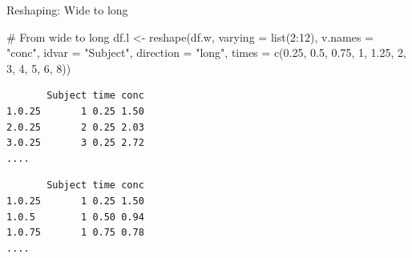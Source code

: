 \documentclass[
  ignorenonframetext,
]{beamer}
\newenvironment{Shaded}{\begin{snugshade}}{\end{snugshade}}
\newcommand{\AttributeTok}[1]{\textcolor[rgb]{0.00,0.34,0.68}{#1}}
\newcommand{\CommentTok}[1]{\textcolor[rgb]{0.54,0.53,0.53}{#1}}
\newcommand{\DecValTok}[1]{\textcolor[rgb]{0.69,0.50,0.00}{#1}}
\newcommand{\FloatTok}[1]{\textcolor[rgb]{0.69,0.50,0.00}{#1}}
\newcommand{\FunctionTok}[1]{\textcolor[rgb]{0.39,0.29,0.61}{#1}}
\newcommand{\NormalTok}[1]{\textcolor[rgb]{0.12,0.11,0.11}{#1}}
\newcommand{\OtherTok}[1]{\textcolor[rgb]{0.00,0.43,0.16}{#1}}
\newcommand{\SpecialCharTok}[1]{\textcolor[rgb]{0.24,0.68,0.91}{#1}}
\newcommand{\StringTok}[1]{\textcolor[rgb]{0.75,0.01,0.01}{#1}}
\begin{document}
\begin{frame}[fragile]{Reshaping: Wide to long}
\protect\hypertarget{reshaping-wide-to-long}{}
\small

\begin{Shaded}
\begin{Highlighting}[]
\CommentTok{\# From wide to long}
\NormalTok{df.l }\OtherTok{\textless{}{-}} \FunctionTok{reshape}\NormalTok{(df.w, }\AttributeTok{varying =} \FunctionTok{list}\NormalTok{(}\DecValTok{2}\SpecialCharTok{:}\DecValTok{12}\NormalTok{), }\AttributeTok{v.names =} \StringTok{"conc"}\NormalTok{,}
    \AttributeTok{idvar =} \StringTok{"Subject"}\NormalTok{, }\AttributeTok{direction =} \StringTok{"long"}\NormalTok{, }\AttributeTok{times =} \FunctionTok{c}\NormalTok{(}\FloatTok{0.25}\NormalTok{, }\FloatTok{0.5}\NormalTok{,}
        \FloatTok{0.75}\NormalTok{, }\DecValTok{1}\NormalTok{, }\FloatTok{1.25}\NormalTok{, }\DecValTok{2}\NormalTok{, }\DecValTok{3}\NormalTok{, }\DecValTok{4}\NormalTok{, }\DecValTok{5}\NormalTok{, }\DecValTok{6}\NormalTok{, }\DecValTok{8}\NormalTok{))}
\end{Highlighting}
\end{Shaded}

\begin{verbatim}
       Subject time conc
1.0.25       1 0.25 1.50
2.0.25       2 0.25 2.03
3.0.25       3 0.25 2.72
....
\end{verbatim}

\begin{Shaded}
\end{Shaded}

\begin{verbatim}
       Subject time conc
1.0.25       1 0.25 1.50
1.0.5        1 0.50 0.94
1.0.75       1 0.75 0.78
....
\end{verbatim}
\end{frame}
\end{document}
